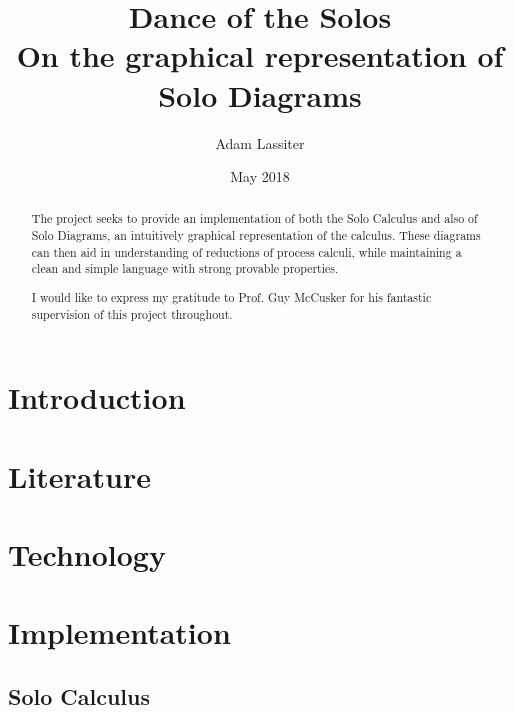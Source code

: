 \documentclass{article}
\title{Dance of the Solos \\
    \large On the graphical representation of Solo Diagrams}
\author{Adam Lassiter}
\date{May 2018}
\begin{document}
    
    \maketitle
    \vspace{\fill}
    \begin{abstract}
        The project seeks to provide an implementation of both the Solo Calculus and also of Solo Diagrams, an intuitively graphical representation of the calculus. These diagrams can then aid in understanding of reductions of process calculi, while maintaining a clean and simple language with strong provable properties.
    \end{abstract}
    \vspace{\fill}
    \pagebreak
    
    \renewcommand{\abstractname}{Acknowledgements}
    \null\vspace{\fill}
    \begin{abstract}
        I would like to express my gratitude to Prof. Guy McCusker for his fantastic supervision of this project throughout.
    \end{abstract}
    \vspace{\fill}
    \pagebreak
    
    \tableofcontents
    \pagebreak

    \section{Introduction}
        

    \section{Literature}
        
        
        
        
        

    \section{Technology}
        

    \section{Implementation}
        \subsection{Solo Calculus}
\end{document}
